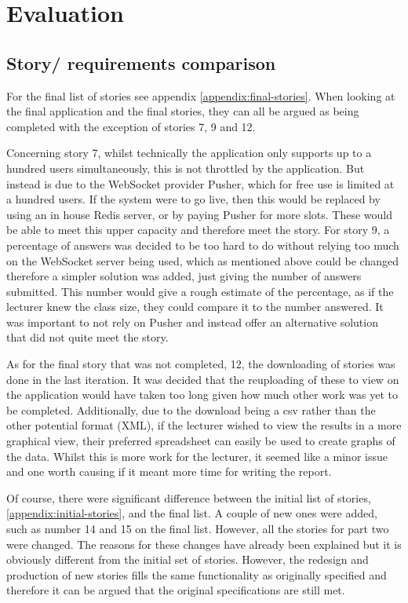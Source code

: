 \chapter{Evaluation}
\section{Story/ requirements comparison}
For the final list of stories see appendix \ref{appendix:final-stories}. When looking at the final application and the final stories, they can all be argued as being completed with the exception of stories 7, 9 and 12. 

Concerning story 7, whilst technically the application only supports up to a hundred users simultaneously, this is not throttled by the application. But instead is due to the WebSocket provider Pusher, which for free use is limited at a hundred users. If the system were to go live, then this would be replaced by using an in house Redis server, or by paying Pusher for more slots. These would be able to meet this upper capacity and therefore meet the story. For story 9, a percentage of answers was decided to be too hard to do without relying too much on the WebSocket server being used, which as mentioned above could be changed therefore a simpler solution was added, just giving the number of answers submitted. This number would give a rough estimate of the percentage, as if the lecturer knew the class size, they could compare it to the number answered. It was important to not rely on Pusher and instead offer an alternative solution that did not quite meet the story.

As for the final story that was not completed, 12, the downloading of stories was done in the last iteration. It was decided that the reuploading of these to view on the application would have taken too long given how much other work was yet to be completed. Additionally, due to the download being a csv rather than the other potential format (XML), if the lecturer wished to view the results in a more graphical view, their preferred spreadsheet can easily be used to create graphs of the data. Whilst this is more work for the lecturer, it seemed like a minor issue and one worth causing if it meant more time for writing the report.

Of course, there were significant difference between the initial list of stories, \ref{appendix:initial-stories}, and the final list. A couple of new ones were added, such as number 14 and 15 on the final list. However, all the stories for part two were changed. The reasons for these changes have already been explained but it is obviously different from the initial set of stories. However, the redesign and production of new stories fills the same functionality as originally specified and therefore it can be argued that the original specifications are still met.


